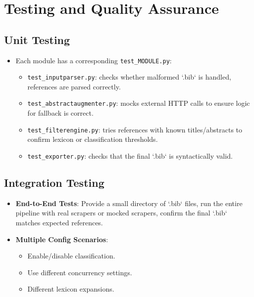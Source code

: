 \documentclass[12pt]{article}
\begin{document}
\section{Testing and Quality Assurance}

\subsection{Unit Testing}
\begin{itemize}
  \item Each module has a corresponding \texttt{test\_MODULE.py}:
    \begin{itemize}
      \item \texttt{test\_inputparser.py}: checks whether malformed `.bib` is handled, references are parsed correctly.
      \item \texttt{test\_abstractaugmenter.py}: mocks external HTTP calls to ensure logic for fallback is correct.
      \item \texttt{test\_filterengine.py}: tries references with known titles/abstracts to confirm lexicon or classification thresholds.
      \item \texttt{test\_exporter.py}: checks that the final `.bib` is syntactically valid.
    \end{itemize}
\end{itemize}

\subsection{Integration Testing}
\begin{itemize}
  \item \textbf{End-to-End Tests}: Provide a small directory of `.bib` files, run the entire pipeline with real scrapers or mocked scrapers, confirm the final `.bib` matches expected references.
  \item \textbf{Multiple Config Scenarios}: 
    \begin{itemize}
      \item Enable/disable classification.
      \item Use different concurrency settings.
      \item Different lexicon expansions.
    \end{itemize}
\end{itemize}
\end{document}
